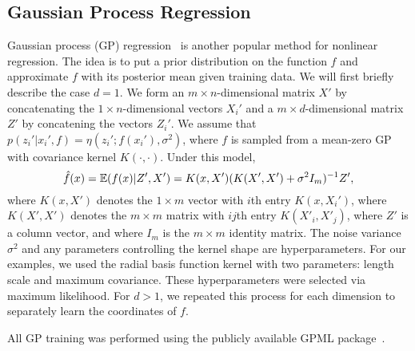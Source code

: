 \subsection{Gaussian Process Regression} \label{s:GP}  

Gaussian process (GP) regression~\cite{Ras06} is another popular method for nonlinear regression. The idea is to put a prior distribution on the function $f$ and approximate $f$ with its posterior mean given training data. We will first briefly describe the case $d=1$. We form an $m\times n$-dimensional matrix $X'$ by concatenating the $1\times n$-dimensional vectors $X_i'$ and a $m\times d$-dimensional matrix $Z'$ by concatening the vectors $Z_i'$.  We assume that $p(z_i'|x_i', f)=\eta(z_i'; f(x_i'),\sigma^2)$, where $f$ is sampled from a mean-zero GP with covariance kernel $K(\cdot,\cdot)$. Under this model,
\begin{equation} \label{e:s2:GPf}  
\hat f(x) 
= \operatorname{\mathbb{E}}(f(x)|Z',X')
= K(x,X')(K(X',X')+\sigma^2 I_m)^{-1} Z',
\end{equation}
where $K(x,X')$ denotes the ${1\!\times\! m}$ vector with $i$th entry $K(x,X_i')$, where $K(X',X')$ denotes the ${m\!\times\! m}$ matrix with $ij$th entry $K(X'_i,X'_j)$, where $Z'$ is a column vector, and where $I_m$ is the ${m\!\times\! m}$ identity matrix. The noise variance $\sigma^2$ and any parameters controlling the kernel shape are hyperparameters. For our examples, we used the radial basis function kernel with two parameters: length scale and maximum covariance.  These hyperparameters were selected via maximum likelihood.  For $d > 1$, we repeated this process for each dimension to separately learn the coordinates of $f$.  

All GP training was performed using the publicly available GPML package~\cite{Ras10}.

